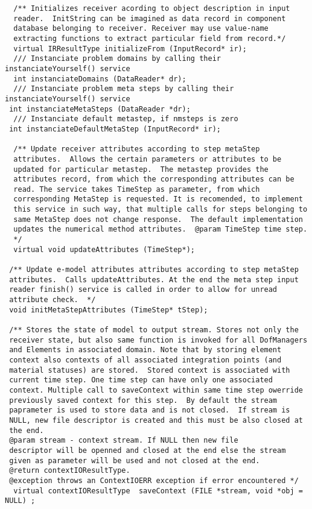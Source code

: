 \documentclass[12pt,draft]{article}
\begin{document}
{\begin{verbatim}
  /** Initializes receiver acording to object description in input
  reader.  InitString can be imagined as data record in component
  database belonging to receiver. Receiver may use value-name
  extracting functions to extract particular field from record.*/
  virtual IRResultType initializeFrom (InputRecord* ir);
  /// Instanciate problem domains by calling their instanciateYourself() service
  int instanciateDomains (DataReader* dr);
  /// Instanciate problem meta steps by calling their instanciateYourself() service
 int instanciateMetaSteps (DataReader *dr);
  /// Instanciate default metastep, if nmsteps is zero
 int instanciateDefaultMetaStep (InputRecord* ir);

  /** Update receiver attributes according to step metaStep
  attributes.  Allows the certain parameters or attributes to be
  updated for particular metastep.  The metastep provides the
  attributes record, from which the corresponding attributes can be
  read. The service takes TimeStep as parameter, from which
  corresponding MetaStep is requested. It is recomended, to implement
  this service in such way, that multiple calls for steps belonging to
  same MetaStep does not change response.  The default implementation
  updates the numerical method attributes.  @param TimeStep time step.
  */
  virtual void updateAttributes (TimeStep*);

 /** Update e-model attributes attributes according to step metaStep
 attributes.  Calls updateAttributes. At the end the meta step input
 reader finish() service is called in order to allow for unread
 attribute check.  */
 void initMetaStepAttributes (TimeStep* tStep);

 /** Stores the state of model to output stream. Stores not only the
 receiver state, but also same function is invoked for all DofManagers
 and Elements in associated domain. Note that by storing element
 context also contexts of all associated integration points (and
 material statuses) are stored.  Stored context is associated with
 current time step. One time step can have only one associated
 context. Multiple call to saveContext within same time step owerride
 previously saved context for this step.  By default the stream
 paprameter is used to store data and is not closed.  If stream is
 NULL, new file descriptor is created and this must be also closed at
 the end.  
 @param stream - context stream. If NULL then new file
 descriptor will be openned and closed at the end else the stream
 given as parameter will be used and not closed at the end.  
 @return contextIOResultType.  
 @exception throws an ContextIOERR exception if error encountered */
  virtual contextIOResultType  saveContext (FILE *stream, void *obj = NULL) ;


\end{verbatim}}
\end{document}
